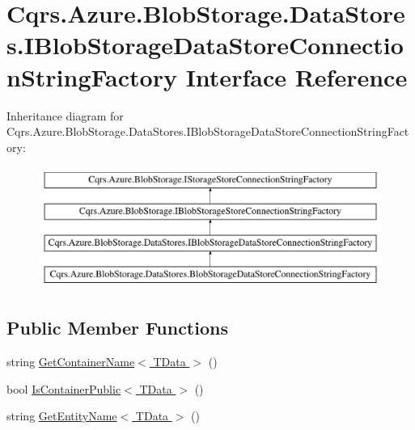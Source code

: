 \hypertarget{interfaceCqrs_1_1Azure_1_1BlobStorage_1_1DataStores_1_1IBlobStorageDataStoreConnectionStringFactory}{}\section{Cqrs.\+Azure.\+Blob\+Storage.\+Data\+Stores.\+I\+Blob\+Storage\+Data\+Store\+Connection\+String\+Factory Interface Reference}
\label{interfaceCqrs_1_1Azure_1_1BlobStorage_1_1DataStores_1_1IBlobStorageDataStoreConnectionStringFactory}
Inheritance diagram for Cqrs.\+Azure.\+Blob\+Storage.\+Data\+Stores.\+I\+Blob\+Storage\+Data\+Store\+Connection\+String\+Factory\+:\begin{figure}[H]
\begin{center}
\leavevmode
\includegraphics[height=4.000000cm]{interfaceCqrs_1_1Azure_1_1BlobStorage_1_1DataStores_1_1IBlobStorageDataStoreConnectionStringFactory}
\end{center}
\end{figure}
\subsection*{Public Member Functions}
\begin{DoxyCompactItemize}
\item 
string \hyperlink{interfaceCqrs_1_1Azure_1_1BlobStorage_1_1DataStores_1_1IBlobStorageDataStoreConnectionStringFactory_a7c86fb71e24cd75b848f67e6864689ae}{Get\+Container\+Name$<$ T\+Data $>$} ()
\item 
bool \hyperlink{interfaceCqrs_1_1Azure_1_1BlobStorage_1_1DataStores_1_1IBlobStorageDataStoreConnectionStringFactory_a328ddc36412d9d01fed52aeed545c1a4}{Is\+Container\+Public$<$ T\+Data $>$} ()
\item 
string \hyperlink{interfaceCqrs_1_1Azure_1_1BlobStorage_1_1DataStores_1_1IBlobStorageDataStoreConnectionStringFactory_ad7f6480ea3fa6dfab0953f05c2c15f85}{Get\+Entity\+Name$<$ T\+Data $>$} ()
\end{DoxyCompactItemize}


